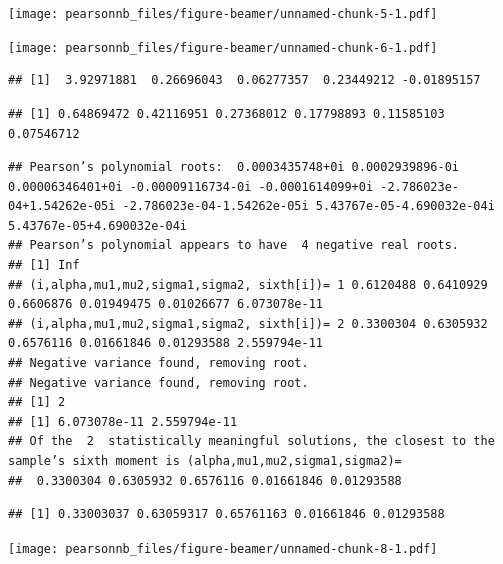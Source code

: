 \documentclass[
  ignorenonframetext,
]{beamer}
\newenvironment{Shaded}{\begin{snugshade}}{\end{snugshade}}
\newcommand{\AttributeTok}[1]{\textcolor[rgb]{0.77,0.63,0.00}{#1}}
\newcommand{\DecValTok}[1]{\textcolor[rgb]{0.00,0.00,0.81}{#1}}
\newcommand{\FunctionTok}[1]{\textcolor[rgb]{0.00,0.00,0.00}{#1}}
\newcommand{\NormalTok}[1]{#1}
\newcommand{\OtherTok}[1]{\textcolor[rgb]{0.56,0.35,0.01}{#1}}
\newcommand{\SpecialCharTok}[1]{\textcolor[rgb]{0.00,0.00,0.00}{#1}}
\begin{document}
\begin{frame}[fragile]{}
\protect\hypertarget{section-6}{}
\texttt{[image: pearsonnb\_files/figure-beamer/unnamed-chunk-5-1.pdf]}

\texttt{[image: pearsonnb\_files/figure-beamer/unnamed-chunk-6-1.pdf]}

\begin{verbatim}
## [1]  3.92971881  0.26696043  0.06277357  0.23449212 -0.01895157
\end{verbatim}
\end{frame}

\begin{frame}[fragile]{}
\protect\hypertarget{section-7}{}
\begin{verbatim}
## [1] 0.64869472 0.42116951 0.27368012 0.17798893 0.11585103 0.07546712
\end{verbatim}

\begin{verbatim}
## Pearson’s polynomial roots:  0.0003435748+0i 0.0002939896-0i 0.00006346401+0i -0.00009116734-0i -0.0001614099+0i -2.786023e-04+1.54262e-05i -2.786023e-04-1.54262e-05i 5.43767e-05-4.690032e-04i 5.43767e-05+4.690032e-04i 
## Pearson’s polynomial appears to have  4 negative real roots. 
## [1] Inf
## (i,alpha,mu1,mu2,sigma1,sigma2, sixth[i])= 1 0.6120488 0.6410929 0.6606876 0.01949475 0.01026677 6.073078e-11 
## (i,alpha,mu1,mu2,sigma1,sigma2, sixth[i])= 2 0.3300304 0.6305932 0.6576116 0.01661846 0.01293588 2.559794e-11 
## Negative variance found, removing root. 
## Negative variance found, removing root. 
## [1] 2
## [1] 6.073078e-11 2.559794e-11
## Of the  2  statistically meaningful solutions, the closest to the sample’s sixth moment is (alpha,mu1,mu2,sigma1,sigma2)=
##  0.3300304 0.6305932 0.6576116 0.01661846 0.01293588
\end{verbatim}

\begin{verbatim}
## [1] 0.33003037 0.63059317 0.65761163 0.01661846 0.01293588
\end{verbatim}

\texttt{[image: pearsonnb\_files/figure-beamer/unnamed-chunk-8-1.pdf]}

\begin{Shaded}
\end{Shaded}
\end{frame}
\end{document}
